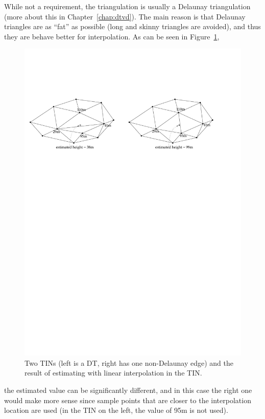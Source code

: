 While not a requirement, the triangulation is usually a Delaunay triangulation (more about this in Chapter~\ref{chap:dtvd}).
The main reason is that Delaunay triangles are as ``fat'' as possible (long and skinny triangles are avoided), and thus they are behave better for interpolation.
As can be seen in Figure~\ref{fig:whydt},
\begin{figure}
  \centering
  \includegraphics[width=\linewidth]{figs/whydt}
  \caption{Two TINs (left is a DT, right has one non-Delaunay edge) and the result of estimating with linear interpolation in the TIN\@.}
\label{fig:whydt}
\end{figure}
the estimated value can be significantly different, and in this case the right one would make more sense since sample points that are closer to the interpolation location are used (in the TIN on the left, the value of 95m is not used).

